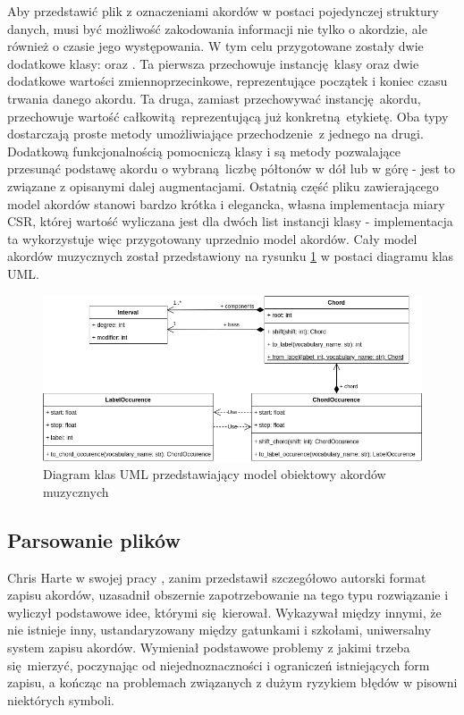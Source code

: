Aby przedstawić plik z oznaczeniami akordów w postaci pojedynczej struktury danych, musi być
możliwość zakodowania informacji nie tylko o akordzie, ale również o czasie jego występowania. W tym
celu przygotowane zostały dwie dodatkowe klasy:  oraz . Ta
pierwsza przechowuje instancję klasy  oraz dwie dodatkowe wartości zmiennoprzecinkowe,
reprezentujące początek i koniec czasu trwania danego akordu. Ta druga, zamiast przechowywać
instancję akordu, przechowuje wartość całkowitą reprezentującą już konkretną etykietę. Oba typy
dostarczają proste metody umożliwiające przechodzenie z jednego na drugi. Dodatkową funkcjonalnością
pomocniczą klasy  i  są metody pozwalające przesunąć podstawę
akordu o wybraną liczbę półtonów w dół lub w górę - jest to związane z opisanymi dalej
augmentacjami. Ostatnią część pliku zawierającego model akordów stanowi bardzo krótka i elegancka,
własna implementacja miary CSR, której wartość wyliczana jest dla dwóch list instancji klasy
 - implementacja ta wykorzystuje więc przygotowany uprzednio model akordów.
Cały model akordów muzycznych został przedstawiony na rysunku \ref{fig:chord_model} w postaci
diagramu klas UML.

\begin{figure}
    \centering
    \caption{Diagram klas UML przedstawiający model obiektowy akordów muzycznych}
    \label{fig:chord_model}
    \includegraphics[width=1.0\textwidth]{./images/chord_model.png}
\end{figure}

\subsection{Parsowanie plików }

Chris Harte w swojej pracy \cite{harte_towards_nodate}, zanim przedstawił szczegółowo autorski
format zapisu akordów, uzasadnił obszernie zapotrzebowanie na tego typu rozwiązanie i wyliczył
podstawowe idee, którymi się kierował. Wykazywał między innymi, że nie istnieje inny,
ustandaryzowany między gatunkami i szkołami, uniwersalny system zapisu akordów.  Wymieniał
podstawowe problemy z jakimi trzeba się mierzyć, poczynając od niejednoznaczności i ograniczeń
istniejących form zapisu, a kończąc na problemach związanych z dużym ryzykiem błędów w pisowni
niektórych symboli.


